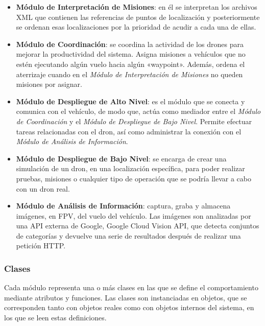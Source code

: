 \begin{itemize}
\item \textbf{Módulo de Interpretación de Misiones}: en él se interpretan los archivos XML que contienen las referencias de puntos de localización y posteriormente se ordenan esas localizaciones por la prioridad de acudir a cada una de ellas.
\item \textbf{Módulo de Coordinación}: se coordina la actividad de los drones para mejorar la productividad del sistema. Asigna misiones a vehículos que no estén ejecutando algún vuelo hacia algún «waypoint». Además, ordena el aterrizaje cuando en el \textit{Módulo de Interpretación de Misiones} no queden misiones por asignar.
\item \textbf{Módulo de Despliegue de Alto Nivel}: es el módulo que se conecta y comunica con el vehículo, de modo que, actúa como mediador entre el \textit{Módulo de Coordinación} y el \textit{Módulo de Despliegue de Bajo Nivel}. Permite efectuar tareas relacionadas con el dron, así como administrar la conexión con el \textit{Módulo de Análisis de Información}.
\item \textbf{Módulo de Despliegue de Bajo Nivel}: se encarga de crear una simulación de un dron, en una localización específica, para poder realizar pruebas, misiones o cualquier tipo de operación que se podría llevar a cabo con un dron real.
\item \textbf{Módulo de Análisis de Información}: captura, graba y almacena imágenes, en \acs{FPV}, del vuelo del vehículo. Las imágenes son analizadas por una \acs{API} externa de Google, Google Cloud Vision \acs{API}, que detecta conjuntos de categorías y devuelve una serie de resultados después de realizar una petición HTTP. 
\end{itemize} 

\subsubsection{Clases}
\label{sec:clases}

Cada módulo representa una o más clases en las que se define el comportamiento mediante atributos y funciones. Las clases son instanciadas en objetos, que se corresponden tanto con objetos reales como con objetos internos del sistema, en los que se leen estas definiciones.

